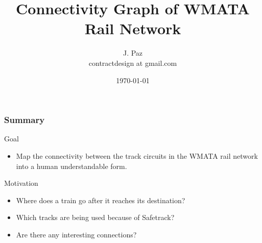 \documentclass[t]{beamer}
\title{Connectivity Graph of WMATA Rail Network}
\author{J. Paz \\{\small contractdesign at gmail.com}}
\date{\today}
\begin{document}
\begin{frame}
\titlepage
\end{frame}

\begin{frame}
\frametitle{Summary}

\begin{block}{Goal}
\begin{itemize}
\item Map the connectivity between the track circuits in the WMATA
  rail network into a human understandable form.
\end{itemize}
\end{block}

\begin{block}{Motivation}
\begin{itemize}
\item Where does a train go after it reaches its destination?
\item Which tracks are being used because of Safetrack?
\item Are there any interesting connections?
\end{itemize}
\end{block}

\end{frame}
\end{document}
